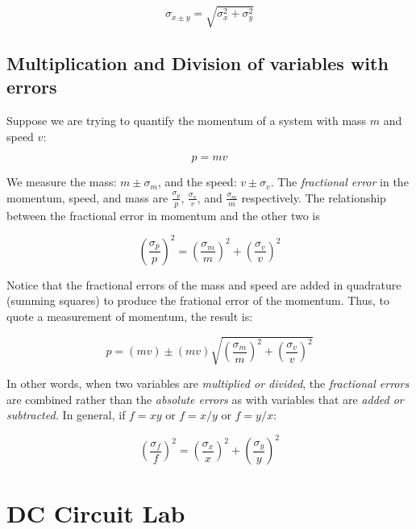 \documentclass[12pt]{article}
\begin{document}
\begin{equation}
\sigma_{x\pm y} = \sqrt{\sigma_x^2 + \sigma_y^2}
\end{equation}

\subsection{Multiplication and Division of variables with errors}

Suppose we are trying to quantify the momentum of a system with mass $m$ and speed $v$:

\begin{equation}
p = mv
\end{equation}

We measure the mass: $m\pm \sigma_m$, and the speed: $v\pm\sigma_v$.  The \textit{fractional error} in the momentum, speed, and mass are $\frac{\sigma_p}{p}$, $\frac{\sigma_v}{v}$, and $\frac{\sigma_m}{m}$ respectively.  The relationship between the fractional error in momentum and the other two is

\begin{equation}
\left(\frac{\sigma_p}{p}\right)^2 = \left(\frac{\sigma_m}{m}\right)^2 + \left(\frac{\sigma_v}{v}\right)^2
\end{equation}

Notice that the fractional errors of the mass and speed are added in quadrature (summing squares) to produce the frational error of the momentum.  Thus, to quote a measurement of momentum, the result is:

\begin{equation}
p = (mv) \pm (mv) \sqrt{\left(\frac{\sigma_m}{m}\right)^2 + \left(\frac{\sigma_v}{v}\right)^2}
\end{equation}

In other words, when two variables are \textit{multiplied or divided}, the \textit{fractional errors} are combined rather than the \textit{absolute errors} as with variables that are \textit{added or subtracted.} In general, if $f=xy$ or $f = x/y$ or $f=y/x$:

\begin{equation}
\left(\frac{\sigma_f}{f}\right)^2 = \left(\frac{\sigma_x}{x}\right)^2 + \left(\frac{\sigma_y}{y}\right)^2 \label{eq:multi}
\end{equation}

\section{DC Circuit Lab}
\end{document}
